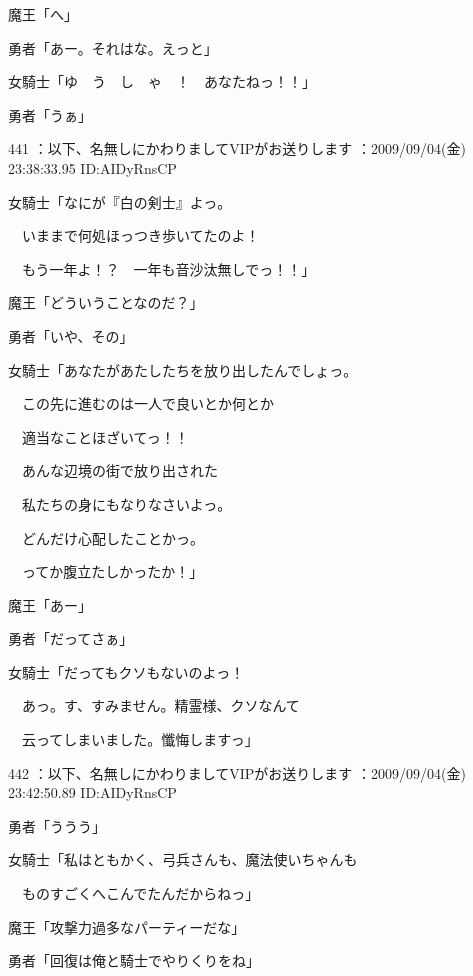 \documentclass[a4j,twocolumn]{tarticle}
\begin{document}
魔王「へ」\par{} 
勇者「あー。それはな。えっと」 



女騎士「ゆ　う　し　ゃ　！　あなたねっ！！」\par{} 
勇者「うぁ」 

	
    
    

441 ：以下、名無しにかわりましてVIPがお送りします ：2009/09/04(金) 23:38:33.95 ID:AIDyRnsCP 


女騎士「なにが『白の剣士』よっ。\par{} 
　いままで何処ほっつき歩いてたのよ！\par{} 
　もう一年よ！？　一年も音沙汰無しでっ！！」 



魔王「どういうことなのだ？」 \par{}
勇者「いや、その」 



女騎士「あなたがあたしたちを放り出したんでしょっ。\par{} 
　この先に進むのは一人で良いとか何とか\par{} 
　適当なことほざいてっ！！ \par{}
　あんな辺境の街で放り出された\par{} 
　私たちの身にもなりなさいよっ。\par{} 
　どんだけ心配したことかっ。\par{} 
　ってか腹立たしかったか！」 



魔王「あー」\par{} 
勇者「だってさぁ」 



女騎士「だってもクソもないのよっ！ \par{}
　あっ。す、すみません。精霊様、クソなんて\par{} 
　云ってしまいました。懺悔しますっ」 

	
    
    

442 ：以下、名無しにかわりましてVIPがお送りします ：2009/09/04(金) 23:42:50.89 ID:AIDyRnsCP 


勇者「ううう」\par{} 
女騎士「私はともかく、弓兵さんも、魔法使いちゃんも\par{} 
　ものすごくへこんでたんだからねっ」 



魔王「攻撃力過多なパーティーだな」\par{} 
勇者「回復は俺と騎士でやりくりをね」 
\end{document}
